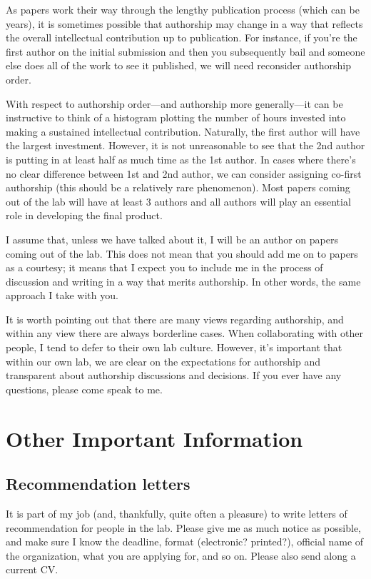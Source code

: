 \documentclass[letterpaper,11pt,oneside]{memoir}
\begin{document}
As papers work their way through the lengthy publication process (which can be years), it is sometimes possible that authorship may change in a way that reflects the overall intellectual contribution up to publication. For instance, if you're the first author on the initial submission and then you subsequently bail and someone else does all of the work to see it published, we will need reconsider authorship order.

With respect to authorship order---and authorship more generally---it can be instructive to think of a histogram plotting the number of hours invested into making a sustained intellectual contribution. Naturally, the first author will have the largest investment. However, it is not unreasonable to see that the 2nd author is putting in at least half as much time as the 1st author. In cases where there's no clear difference between 1st and 2nd author, we can consider assigning co-first authorship (this should be a relatively rare phenomenon). Most papers coming out of the lab will have at least 3 authors and all authors will play an essential role in developing the final product.

I assume that, unless we have talked about it, I will be an author on papers coming out of the lab. This does not mean that you should add me on to papers as a courtesy; it means that I expect you to include me in the process of discussion and writing in a way that merits authorship. In other words, the same approach I take with you.

It is worth pointing out that there are many views regarding authorship, and within any view there are always borderline cases. When collaborating with other people, I tend to defer to their own lab culture. However, it's important that within our own lab, we are clear on the expectations for authorship and transparent about authorship discussions and decisions. If you ever have any questions, please come speak to me.


\chapter{Other Important Information}
\section{Recommendation letters}
It is part of my job (and, thankfully, quite often a pleasure) to write letters of recommendation for people in the lab. Please give me as much notice as possible, and make sure I know the deadline, format (electronic? printed?), official name of the organization, what you are applying for, and so on. Please also send along a current CV.
\end{document}
